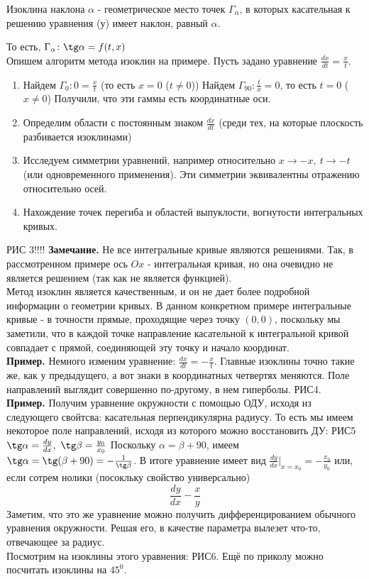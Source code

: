 \begin{defin}
Изоклина наклона $\alpha$ - геометрическое место точек $\Gamma_\alpha$, в 
которых касательная к решению уравнения (у) имеет наклон, равный $\alpha$.
\end{defin}
То есть, $\Gamma_\alpha\colon \tg\alpha=f(t,x)$\\
Опишем алгоритм метода изоклин на примере. Пусть задано уравнение 
$\frac{dx}{dt}=\frac{x}{t}$. 
\begin{enumerate}
    \item Найдем $\Gamma_0:0=\frac{x}{t}$ (то есть $x=0$ ($t\ne0$))
     Найдем $\Gamma_{90}:\frac{t}{x}=0$, то есть $t=0$ ($x\ne0$) 
    Получили, что эти гаммы есть координатные оси. 
    \item Определим области с постоянным знаком $\frac{dx}{dt}$ (среди тех,
        на которые плоскость разбивается изоклинами) 
    \item Исследуем симметрии уравнений, например относительно 
    $x\to-x,~t\to-t$ (или одновременного применения). Эти симметрии
    эквивалентны отражению относительно осей.
    \item Нахождение точек перегиба и областей выпуклости, вогнутости 
интегральных кривых.   
\end{enumerate}
РИС 3!!!!
\textbf{Замечание.} Не все интегральные кривые являются решениями. Так, в 
рассмотренном примере ось $Ox$ - интегральная кривая, но она очевидно не 
является решением (так как не является функцией). \\
Метод изоклин является качественным, и он не дает более подробной информации
о геометрии кривых. В данном конкретном примере интегральные кривые - в 
точности прямые, проходящие через точку $(0,0)$, поскольку мы заметили, что в 
каждой точке направление касательной к интегральной кривой совпадает с прямой, 
соединяющей эту точку и начало координат.\\
\textbf{Пример.} Немного изменим уравнение: $\frac{dx}{dt}=-\frac{x}{t}$. 
Главные изоклины точно такие же, как у предыдущего, а вот знаки в координатных
четвертях меняются. Поле направлений выглядит совершенно по-другому, в нем 
гиперболы. РИС4. \\
\textbf{Пример.} Получим уравнение окружности с помощью ОДУ, исходя из 
следующего свойтсва: касательная перпендикулярна радиусу. То есть мы имеем 
некоторое поле направлений, исходя из которого можно восстановить ДУ:
РИС5
$\tg\alpha=\frac{dy}{dx},~\tg\beta=\frac{y_0}{x_0}$ 
Поскольку $\alpha=\beta+90$, имеем
$\tg\alpha=\tg(\beta+90)=-\frac{1}{\tg\beta}$. В итоге уравнение имеет вид
$\frac{dy}{dx}\big|_{x=x_0}=-\frac{x_0}{y_0}$
или, если сотрем нолики (посокльку свойство универсально)
$$\frac{dy}{dx}-\frac{x}{y}$$
Заметим, что это же уравнение можно получить дифференцированием обычного
уравнения окружности. Решая его, в качестве параметра вылезет что-то, 
отвечающее за радиус. \\
Посмотрим на изоклины этого уравнения: РИС6. Ещё по приколу можно посчитать 
изоклины на $45^0$.

